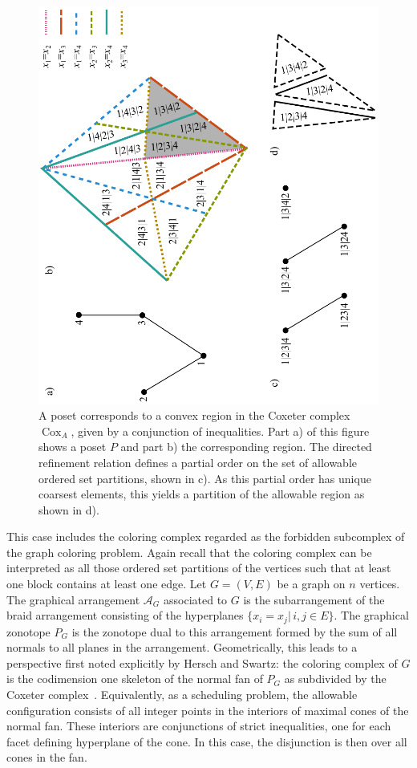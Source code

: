 \documentclass[12pt,reqno]{amsart}
\numberwithin{definition}{section}
\theoremstyle{definition}
\newcommand{\cox}{\operatorname{Cox}}
\begin{document}
\begin{figure}[h]
\includegraphics[angle=270,width=5in]{coxeter_complex_poset}
\caption{A poset corresponds to a convex region in the Coxeter complex $\cox_A$, given by a conjunction of inequalities. Part a) of this figure shows a poset $P$ and part b) the corresponding region. The directed refinement relation defines a partial order on the set of allowable ordered set partitions, shown in c). As this partial order has unique coarsest elements, this yields a partition of the allowable region as shown in d).}
\label{fig:poset}
\end{figure}

This case  includes the coloring complex regarded as the forbidden
subcomplex of the graph coloring problem.  Again recall that the
coloring complex can be interpreted as all those ordered set
partitions of the vertices such that at least one block contains at
least one edge.  Let $G=(V,E)$ be a graph on $n$ vertices.  The
graphical arrangement $\mathcal{A}_G$ associated to $G$ is the
subarrangement of the braid arrangement consisting of the hyperplanes
$\{x_i = x_j | \, i,j \in E\}$. The graphical zonotope ${P}_G$ is the
zonotope dual to this arrangement formed by the sum of all normals to
all planes in the arrangement.  Geometrically, this leads to a
perspective first noted explicitly by Hersch and Swartz: the coloring
complex of $G$ is the codimension one skeleton of the normal fan of ${P}_G$
as subdivided by the Coxeter complex~\cite{HS}.  Equivalently, as a scheduling problem,  the
allowable configuration consists of all integer points in the
interiors of maximal cones of the normal fan.  These interiors are
conjunctions of strict inequalities, one for each facet defining
hyperplane of the cone.  In this case, the disjunction is then over
all cones in the fan.
\end{document}
